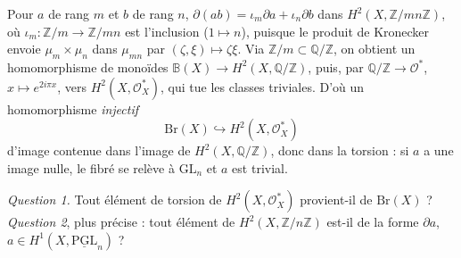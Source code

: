 \documentclass[11pt,a4paper]{article}
\begin{document}
Pour $a$ de rang $m$ et $b$ de rang $n$, $\partial(ab) = \iota_m \partial a +
\iota_n \partial b$ dans $H^2(X, \mathbb{Z}/mn\mathbb{Z})$, où $\iota_m :
\mathbb{Z}/m \to \mathbb{Z}/mn$ est l'inclusion ($1 \mapsto n$), puisque
le produit de Kronecker envoie $\mu_m \times \mu_n$ dans $\mu_{mn}$ par
$(\zeta, \xi) \mapsto \zeta\xi$. Via $\mathbb{Z}/m \subset \mathbb{Q}/\mathbb{Z}$,
on obtient un homomorphisme de monoïdes $\mathbb{B}(X) \to H^2(X,
\mathbb{Q}/\mathbb{Z})$, puis, par $\mathbb{Q}/\mathbb{Z} \to
\mathcal{O}^{*}$, $x \mapsto e^{2i\pi x}$, vers $H^2(X, \mathcal{O}_X^{*})$, qui
tue les classes triviales. D'où un homomorphisme \emph{injectif}
\[
\mathrm{Br}(X) \hookrightarrow H^2(X, \mathcal{O}_X^{*})
\]
d'image contenue dans l'image de $H^2(X, \mathbb{Q}/\mathbb{Z})$, donc dans la
torsion : si $a$ a une image nulle, le fibré se relève à $\mathrm{GL}_n$ et $a$
est trivial.

\emph{Question 1.} Tout élément de torsion de $H^2(X, \mathcal{O}_X^{*})$
provient-il de $\mathrm{Br}(X)$ ? \emph{Question 2}, plus précise : tout
élément de $H^2(X, \mathbb{Z}/n\mathbb{Z})$ est-il de la forme $\partial a$, $a
\in H^1(X, \underline{\mathrm{PGL}}_n)$ ?
\end{document}
